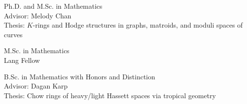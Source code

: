 
  {Ph.D. and M.Sc. in Mathematics\\
   Advisor: Melody Chan\\
   Thesis: $K$-rings and Hodge structures in graphs, matroids, and moduli spaces of curves}

  {M.Sc. in Mathematics\\
   Lang Fellow}

  {B.Sc. in Mathematics with Honors and Distinction\\
   Advisor: Dagan Karp\\
   Thesis: Chow rings of heavy/light Hassett spaces via tropical geometry}
